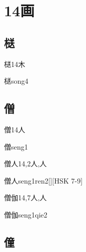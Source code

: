 \section*{14画}

\subsection*{㮸}

\begin{Entry}{㮸}{14}{⽊}
  \begin{Phonetics}{㮸}{song4}
  \end{Phonetics}
\end{Entry}

\subsection*{僧}

\begin{Entry}{僧}{14}{⼈}
  \begin{Phonetics}{僧}{seng1}
  \end{Phonetics}
\end{Entry}

\begin{Entry}{僧人}{14,2}{⼈,⼈}
  \begin{Phonetics}{僧人}{seng1ren2}[][HSK 7-9]
  \end{Phonetics}
\end{Entry}

\begin{Entry}{僧伽}{14,7}{⼈,⼈}
  \begin{Phonetics}{僧伽}{seng1qie2}
  \end{Phonetics}
\end{Entry}

\subsection*{僮}

